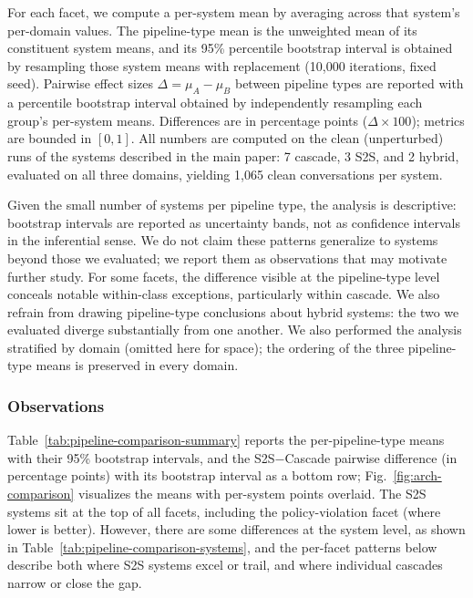 For each facet, we compute a per-system mean by averaging across that
system's per-domain values. The pipeline-type mean is the unweighted mean of
its constituent system means, and its 95\% percentile bootstrap interval is
obtained by resampling those system means with replacement
(10{,}000 iterations, fixed seed). Pairwise effect sizes
$\Delta = \mu_A - \mu_B$ between pipeline types are reported with a
percentile bootstrap interval obtained by independently resampling each
group's per-system means. Differences are in percentage points
($\Delta \times 100$); metrics are bounded in $[0, 1]$. All numbers are computed on the clean (unperturbed) runs of the systems described in the main paper: 7 cascade, 3 S2S, and 2 hybrid, evaluated on all three domains, yielding 1{,}065 clean conversations per system.

Given the small number of systems per pipeline type, the analysis is descriptive: bootstrap intervals are reported as uncertainty bands, not as confidence intervals in the inferential sense. We do not claim these patterns generalize to systems beyond those we evaluated; we report them as observations that may motivate further study. For some facets, the difference visible at the pipeline-type level conceals notable within-class exceptions, particularly within cascade. We also refrain from drawing pipeline-type conclusions about hybrid systems: the two we evaluated diverge substantially from one another. We also performed the analysis stratified by domain (omitted here for space); the ordering of the three pipeline-type means is preserved in every domain.

\subsubsection{Observations}
\label{app:pipeline-comparison-summary}




Table~\ref{tab:pipeline-comparison-summary} reports the per-pipeline-type means with their 95\% bootstrap intervals, and the S2S$-$Cascade pairwise difference (in percentage points) with its bootstrap interval as a bottom row; Fig.~\ref{fig:arch-comparison} visualizes the means with per-system points overlaid. The S2S systems sit at the top of all facets, including the policy-violation facet (where lower is better). However, there are some differences at the system level, as shown in Table~\ref{tab:pipeline-comparison-systems}, and the per-facet patterns below describe both where S2S systems excel or trail, and where individual cascades narrow or close the gap.


